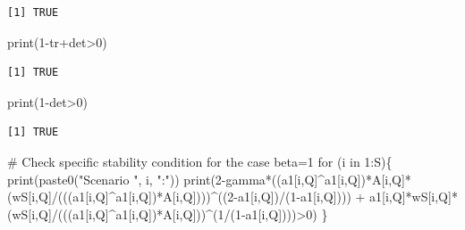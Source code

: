 \documentclass[
  letterpaper,
  DIV=11,
  numbers=noendperiod]{scrreprt}
\newenvironment{Shaded}{\begin{snugshade}}{\end{snugshade}}
\newcommand{\CommentTok}[1]{\textcolor[rgb]{0.37,0.37,0.37}{#1}}
\newcommand{\ControlFlowTok}[1]{\textcolor[rgb]{0.00,0.23,0.31}{#1}}
\newcommand{\DecValTok}[1]{\textcolor[rgb]{0.68,0.00,0.00}{#1}}
\newcommand{\FunctionTok}[1]{\textcolor[rgb]{0.28,0.35,0.67}{#1}}
\newcommand{\NormalTok}[1]{\textcolor[rgb]{0.00,0.23,0.31}{#1}}
\newcommand{\SpecialCharTok}[1]{\textcolor[rgb]{0.37,0.37,0.37}{#1}}
\newcommand{\StringTok}[1]{\textcolor[rgb]{0.13,0.47,0.30}{#1}}
\begin{document}
\begin{verbatim}
[1] TRUE
\end{verbatim}

\begin{Shaded}
\begin{Highlighting}[]
\FunctionTok{print}\NormalTok{(}\DecValTok{1}\SpecialCharTok{{-}}\NormalTok{tr}\SpecialCharTok{+}\NormalTok{det}\SpecialCharTok{\textgreater{}}\DecValTok{0}\NormalTok{)}
\end{Highlighting}
\end{Shaded}

\begin{verbatim}
[1] TRUE
\end{verbatim}

\begin{Shaded}
\begin{Highlighting}[]
\FunctionTok{print}\NormalTok{(}\DecValTok{1}\SpecialCharTok{{-}}\NormalTok{det}\SpecialCharTok{\textgreater{}}\DecValTok{0}\NormalTok{)}
\end{Highlighting}
\end{Shaded}

\begin{verbatim}
[1] TRUE
\end{verbatim}

\begin{Shaded}
\begin{Highlighting}[]
\CommentTok{\# Check specific stability condition for the case beta=1}
\ControlFlowTok{for}\NormalTok{ (i }\ControlFlowTok{in} \DecValTok{1}\SpecialCharTok{:}\NormalTok{S)\{}
\FunctionTok{print}\NormalTok{(}\FunctionTok{paste0}\NormalTok{(}\StringTok{"Scenario "}\NormalTok{, i, }\StringTok{":"}\NormalTok{))}
\FunctionTok{print}\NormalTok{(}\DecValTok{2}\SpecialCharTok{{-}}\NormalTok{gamma}\SpecialCharTok{*}\NormalTok{((a1[i,Q]}\SpecialCharTok{\^{}}\NormalTok{a1[i,Q])}\SpecialCharTok{*}\NormalTok{A[i,Q]}\SpecialCharTok{*}\NormalTok{(wS[i,Q]}\SpecialCharTok{/}\NormalTok{(((a1[i,Q]}\SpecialCharTok{\^{}}\NormalTok{a1[i,Q])}\SpecialCharTok{*}\NormalTok{A[i,Q])))}\SpecialCharTok{\^{}}\NormalTok{((}\DecValTok{2}\SpecialCharTok{{-}}\NormalTok{a1[i,Q])}\SpecialCharTok{/}\NormalTok{(}\DecValTok{1}\SpecialCharTok{{-}}\NormalTok{a1[i,Q]))) }\SpecialCharTok{+}\NormalTok{ a1[i,Q]}\SpecialCharTok{*}\NormalTok{wS[i,Q]}\SpecialCharTok{*}\NormalTok{(wS[i,Q]}\SpecialCharTok{/}\NormalTok{(((a1[i,Q]}\SpecialCharTok{\^{}}\NormalTok{a1[i,Q])}\SpecialCharTok{*}\NormalTok{A[i,Q]))}\SpecialCharTok{\^{}}\NormalTok{(}\DecValTok{1}\SpecialCharTok{/}\NormalTok{(}\DecValTok{1}\SpecialCharTok{{-}}\NormalTok{a1[i,Q])))}\SpecialCharTok{\textgreater{}}\DecValTok{0}\NormalTok{)}
\NormalTok{\}}
\end{Highlighting}
\end{Shaded}
\end{document}
